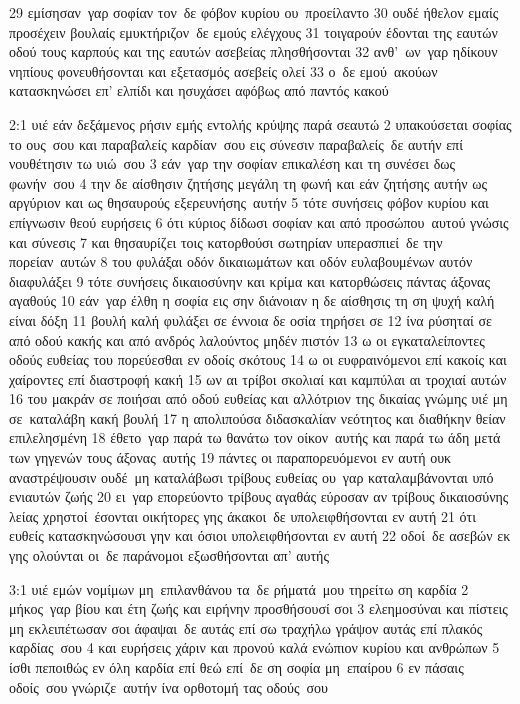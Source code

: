 \documentclass[10pt,oneside,footinclude=true,headinclude=true]{scrbook} %
\begin{document}
29 εμίσησαν γαρ σοφίαν τον δε φόβον κυρίου ου προείλαντο
30 ουδέ ήθελον εμαίς προσέχειν βουλαίς εμυκτήριζον δε εμούς ελέγχους
31 τοιγαρούν έδονται της εαυτών οδού τους καρπούς και της εαυτών ασεβείας πλησθήσονται
32 ανθ' ων γαρ ηδίκουν νηπίους φονευθήσονται και εξετασμός ασεβείς ολεί
33 ο δε εμού ακούων κατασκηνώσει επ' ελπίδι και ησυχάσει αφόβως από παντός κακού
\par
2:1 υιέ εάν δεξάμενος ρήσιν εμής εντολής κρύψης παρά σεαυτώ
2 υπακούσεται σοφίας το ους σου και παραβαλείς καρδίαν σου εις σύνεσιν παραβαλείς δε αυτήν επί νουθέτησιν τω υιώ σου
3 εάν γαρ την σοφίαν επικαλέση και τη συνέσει δως φωνήν σου
4 την δε αίσθησιν ζητήσης μεγάλη τη φωνή και εάν ζητήσης αυτήν ως αργύριον και ως θησαυρούς εξερευνήσης αυτήν
5 τότε συνήσεις φόβον κυρίου και επίγνωσιν θεού ευρήσεις
6 ότι κύριος δίδωσι σοφίαν και από προσώπου αυτού γνώσις και σύνεσις
7 και θησαυρίζει τοις κατορθούσι σωτηρίαν υπερασπιεί δε την πορείαν αυτών
8 του φυλάξαι οδόν δικαιωμάτων και οδόν ευλαβουμένων αυτόν διαφυλάξει
9 τότε συνήσεις δικαιοσύνην και κρίμα και κατορθώσεις πάντας άξονας αγαθούς
10 εάν γαρ έλθη η σοφία εις σην διάνοιαν η δε αίσθησις τη ση ψυχή καλή είναι δόξη
11 βουλή καλή φυλάξει σε έννοια δε οσία τηρήσει σε
12 ίνα ρύσηταί σε από οδού κακής και από ανδρός λαλούντος μηδέν πιστόν
13 ω οι εγκαταλείποντες οδούς ευθείας του πορεύεσθαι εν οδοίς σκότους
14 ω οι ευφραινόμενοι επί κακοίς και χαίροντες επί διαστροφή κακή
15 ων αι τρίβοι σκολιαί και καμπύλαι αι τροχιαί αυτών
16 του μακράν σε ποιήσαι από οδού ευθείας και αλλότριον της δικαίας γνώμης υιέ μη σε καταλάβη κακή βουλή
17 η απολιπούσα διδασκαλίαν νεότητος και διαθήκην θείαν επιλελησμένη
18 έθετο γαρ παρά τω θανάτω τον οίκον αυτής και παρά τω άδη μετά των γηγενών τους άξονας αυτής
19 πάντες οι παραπορευόμενοι εν αυτή ουκ αναστρέψουσιν ουδέ μη καταλάβωσι τρίβους ευθείας ου γαρ καταλαμβάνονται υπό ενιαυτών ζωής
20 ει γαρ επορεύοντο τρίβους αγαθάς εύροσαν αν τρίβους δικαιοσύνης λείας χρηστοί έσονται οικήτορες γης άκακοι δε υπολειφθήσονται εν αυτή
21 ότι ευθείς κατασκηνώσουσι γην και όσιοι υπολειφθήσονται εν αυτή
22 οδοί δε ασεβών εκ γης ολούνται οι δε παράνομοι εξωσθήσονται απ' αυτής
\par
3:1 υιέ εμών νομίμων μη επιλανθάνου τα δε ρήματά μου τηρείτω ση καρδία
2 μήκος γαρ βίου και έτη ζωής και ειρήνην προσθήσουσί σοι
3 ελεημοσύναι και πίστεις μη εκλειπέτωσαν σοι άφαψαι δε αυτάς επί σω τραχήλω γράψον αυτάς επί πλακός καρδίας σου
4 και ευρήσεις χάριν και προνού καλά ενώπιον κυρίου και ανθρώπων
5 ίσθι πεποιθώς εν όλη καρδία επί θεώ επί δε ση σοφία μη επαίρου
6 εν πάσαις οδοίς σου γνώριζε αυτήν ίνα ορθοτομή τας οδούς σου
\end{document}
